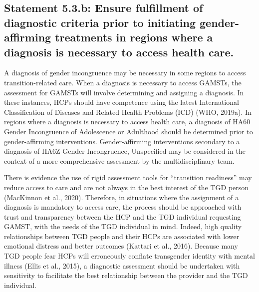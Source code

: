 \documentclass[
]{book}
\begin{document}
\hypertarget{statement-5.3.b-ensure-fulfillment-of-diagnostic-criteria-prior-to-initiating-gender-affirming-treatments-in-regions-where-a-diagnosis-is-necessary-to-access-health-care.}{%
\subsection*{Statement 5.3.b: Ensure fulfillment of diagnostic criteria prior to initiating gender-affirming treatments in regions where a diagnosis is necessary to access health care.}\label{statement-5.3.b-ensure-fulfillment-of-diagnostic-criteria-prior-to-initiating-gender-affirming-treatments-in-regions-where-a-diagnosis-is-necessary-to-access-health-care.}}

A diagnosis of gender incongruence may be necessary in some regions to access transition-related
care. When a diagnosis is necessary to access
GAMSTs, the assessment for GAMSTs will involve
determining and assigning a diagnosis. In these
instances, HCPs should have competence using the
latest International Classification of Diseases and
Related Health Problems (ICD) (WHO, 2019a). In
regions where a diagnosis is necessary to access
health care, a diagnosis of HA60 Gender Incongruence
of Adolescence or Adulthood should be determined
prior to gender-affirming interventions.
Gender-affirming interventions secondary to a diagnosis of HA6Z Gender Incongruence, Unspecified may
be considered in the context of a more comprehensive assessment by the multidisciplinary team.

There is evidence the use of rigid assessment
tools for ``transition readiness'' may reduce access
to care and are not always in the best interest of
the TGD person (MacKinnon et al., 2020).
Therefore, in situations where the assignment of
a diagnosis is mandatory to access care, the process should be approached with trust and
transparency between the HCP and the TGD
individual requesting GAMST, with the needs of
the TGD individual in mind. Indeed, high quality
relationships between TGD people and their
HCPs are associated with lower emotional distress
and better outcomes (Kattari et al., 2016). Because
many TGD people fear HCPs will erroneously
conflate transgender identity with mental illness
(Ellis et al., 2015), a diagnostic assessment should
be undertaken with sensitivity to facilitate the
best relationship between the provider and the
TGD individual.
\end{document}
